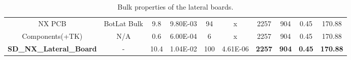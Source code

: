 \begin{table}[H]
{\begin{tabular}{@{}cccccccccc@{}}
  NX PCB                          & BotLat Bulk       & 9.8            & 9.80E-03        & 94                       & x                               & 2257                              & 904                                   & 0.45                                      & 170.88                                    \\ 
  Components(+TK)                 & N/A               & 0.6            & 6.00E-04        & 6                       & x                               & 2257                              & 904                                   & 0.45                                      & 170.88                                    \\
  \textbf{SD\_NX\_Lateral\_Board}                  & -                 & 10.4           & 1.04E-02        & 100                          & 4.61E-06                        & \textbf{2257}                              & \textbf{904}                                   & \textbf{0.45}                                      & \textbf{170.88}                                   \\ \bottomrule
  \end{tabular}
  }
  \caption{Bulk properties of the lateral boards.}
\end{table}


